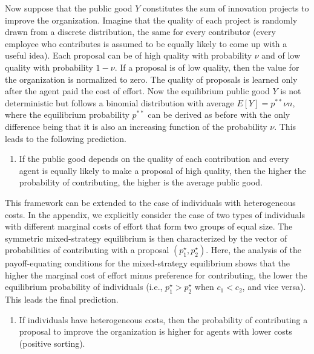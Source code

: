 \documentclass[12pt, titlepage]{article}
\providecommand{\tightlist}{%
  \setlength{\itemsep}{0pt}\setlength{\parskip}{0pt}}
\begin{document}
Now suppose that the public good \(Y\) constitutes the sum of innovation
projects to improve the organization. Imagine that the quality of each
project is randomly drawn from a discrete distribution, the same for
every contributor (every employee who contributes is assumed to be
equally likely to come up with a useful idea). Each proposal can be of
high quality with probability \(\nu\) and of low quality with
probability \(1-\nu\). If a proposal is of low quality, then the value
for the organization is normalized to zero. The quality of proposals is
learned only after the agent paid the cost of effort. Now the
equilibrium public good \(Y\) is not deterministic but follows a
binomial distribution with average \(E[Y] = p^{**} \nu n\), where the
equilibrium probability \(p^{**}\) can be derived as before with the
only difference being that it is also an increasing function of the
probability \(\nu\). This leads to the following prediction.

\begin{enumerate}
\def\labelenumi{\arabic{enumi})}
\setcounter{enumi}{3}
\tightlist
\item
  If the public good depends on the quality of each contribution and
  every agent is equally likely to make a proposal of high quality, then
  the higher the probability of contributing, the higher is the average
  public good.
\end{enumerate}

This framework can be extended to the case of individuals with
heterogeneous costs. In the appendix, we explicitly consider the case of
two types of individuals with different marginal costs of effort that
form two groups of equal size. The symmetric mixed-strategy equilibrium
is then characterized by the vector of probabilities of contributing
with a proposal \((p_1^\star, p_2^\star)\). Here, the analysis of the
payoff-equating conditions for the mixed-strategy equilibrium shows that
the higher the marginal cost of effort minus preference for
contributing, the lower the equilibrium probability of individuals
(i.e., \(p_1^\star > p_2^\star\) when \(c_1 < c_2\), and vice versa).
This leads the final prediction.

\begin{enumerate}
\def\labelenumi{\arabic{enumi})}
\setcounter{enumi}{4}
\tightlist
\item
  If individuals have heterogeneous costs, then the probability of
  contributing a proposal to improve the organization is higher for
  agents with lower costs (positive sorting).
\end{enumerate}
\end{document}
